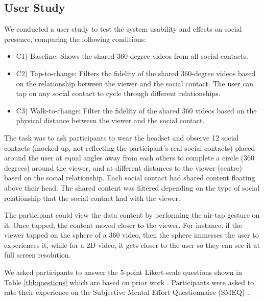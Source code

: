 \subsection{User Study}

We conducted a user study to test the system usability and effects on social presence, comparing the following conditions: 

\begin{itemize}
    \item C1) Baseline: Shows the shared 360-degree videos from all social contacts.
    \item C2) Tap-to-change: Filters the fidelity of the shared 360-degree videos based on the relationship between the viewer and the social contact. The user can tap on any social contact to cycle through different relationships.
    \item C3) Walk-to-change: Filter the fidelity of the shared 360 videos based on the physical distance between the viewer and the social contact.
\end{itemize}

The task was to ask participants to wear the headset and observe 12 social contacts (mocked up, not reflecting the participant's real social contacts) placed around the user at equal angles away from each others to complete a circle (360 degrees) around the viewer, and at different distances to the viewer (centre)  based on the social relationship. 
Each social contact had shared content floating above their head. The shared content was filtered depending on the type of social relationship that the social contact had with the viewer. 

The participant could view the data content by performing the air-tap gesture on it. Once tapped, the content moved closer to the viewer. For instance, if the viewer tapped on the sphere of a 360 video, then the sphere immerses the user to experiences it, while for a 2D video, it gets closer to the user so they can see it at full screen resolution.

We asked participants to answer the 5-point Likert-scale questions shown in Table \ref{tbl:questions} which are based on prior work \cite{Biocca2003}. Participants were asked to rate their experience on the Subjective Mental Effort Questionnaire (SMEQ) \cite{Sauro2009}. 

